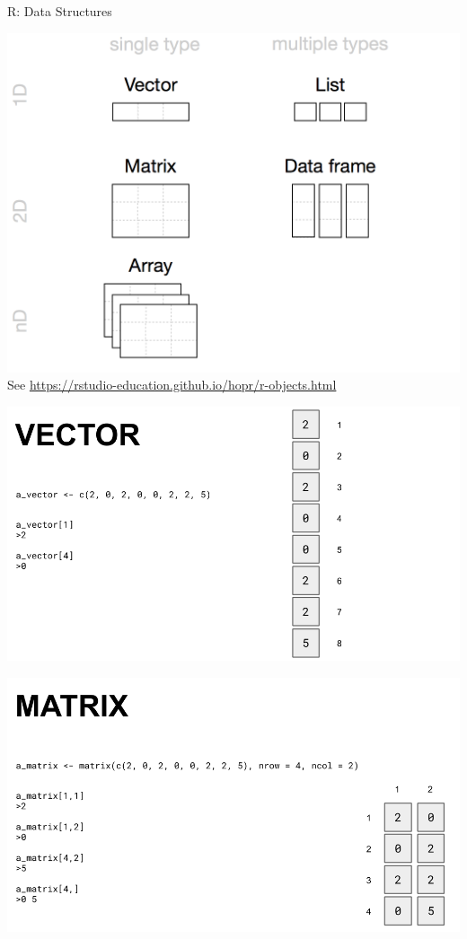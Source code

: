 \documentclass[
  ignorenonframetext,
]{beamer}
\begin{document}
\begin{frame}{R: Data Structures}
\protect\hypertarget{r-data-structures-1}{}

\includegraphics{../external/images/rstudio_datastructs.png} See
\url{https://rstudio-education.github.io/hopr/r-objects.html}

\end{frame}

\begin{frame}

\includegraphics{../external/images/VECTOR.png}

\end{frame}

\begin{frame}

\includegraphics{../external/images/MATRIX.png}

\end{frame}
\end{document}
